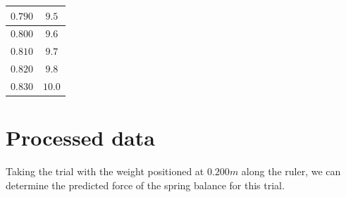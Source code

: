 \documentclass[letterpaper, 12pt]{article}
\begin{document}
\begin{longtable}{|c|c|}
    \hline
    $0.790$                                                                                                                                                                     & $9.5$                                                                                                                                                                                  \\
    \hline
    $0.800$                                                                                                                                                                     & $9.6$                                                                                                                                                                                  \\
    \hline
    $0.810$                                                                                                                                                                     & $9.7$                                                                                                                                                                                  \\
    \hline
    $0.820$                                                                                                                                                                     & $9.8$                                                                                                                                                                                  \\
    \hline
    $0.830$                                                                                                                                                                     & $10.0$                                                                                                                                                                                 \\
    \hline
\end{longtable}


\section{Processed data}

Taking the trial with the weight positioned at $0.200\unit{m}$ along the ruler,
we can determine the predicted force of the spring balance for this trial.
\end{document}
